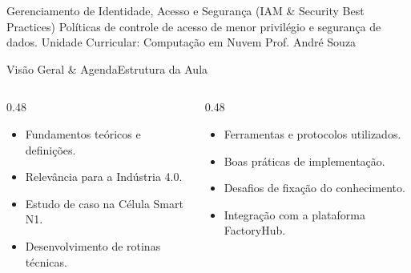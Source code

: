 
\senaicover
  {Gerenciamento de Identidade, Acesso e Segurança (IAM & Security Best Practices)}
  {Políticas de controle de acesso de menor privilégio e segurança de dados.}
  {Unidade Curricular: Computação em Nuvem}
  {Prof. André Souza}

\begin{senaiframe}{Visão Geral \& Agenda}{Estrutura da Aula}
  \begin{columns}[t]
    \begin{column}{0.48\textwidth}
      \begin{tcolorbox}[senaibluecard, title={1. Conceitos Chave}]
        \begin{itemize}
          \item Fundamentos teóricos e definições.
          \item Relevância para a Indústria 4.0.
        \end{itemize}
      \end{tcolorbox}
      \vspace{4pt}
      \begin{tcolorbox}[senaiambercard, title={3. Aplicação Prática}]
        \begin{itemize}
          \item Estudo de caso na Célula Smart N1.
          \item Desenvolvimento de rotinas técnicas.
        \end{itemize}
      \end{tcolorbox}
    \end{column}
    \begin{column}{0.48\textwidth}
      \begin{tcolorbox}[senairedcard, title={2. Detalhamento Técnico}]
        \begin{itemize}
          \item Ferramentas e protocolos utilizados.
          \item Boas práticas de implementação.
        \end{itemize}
      \end{tcolorbox}
      \vspace{4pt}
      \begin{tcolorbox}[senaigreencard, title={4. Exercícios \& Avaliação}]
        \begin{itemize}
          \item Desafios de fixação do conhecimento.
          \item Integração com a plataforma FactoryHub.
        \end{itemize}
      \end{tcolorbox}
    \end{column}
  \end{columns}
\end{senaiframe}

